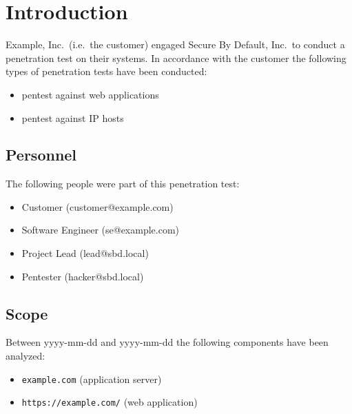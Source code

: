 \documentclass[a4paper]{article}
\newcommand{\passthrough}[1]{\colorbox{code}{\lstset{mathescape=false}#1}}
\begin{document}
\clearpage
\tableofcontents

\clearpage
\section{Introduction}

Example, Inc.\ (i.e.\ the customer) engaged Secure By Default, Inc.\ to conduct a penetration test on their systems.
In accordance with the customer the following types of penetration tests have been conducted:

\begin{itemize}
      \item pentest against web applications

      \item pentest against IP hosts

  \end{itemize}

\subsection{Personnel}

The following people were part of this penetration test:

\begin{itemize}
      \item Customer (customer@example.com)

      \item Software Engineer (se@example.com)

      \item Project Lead (lead@sbd.local)

      \item Pentester (hacker@sbd.local)

  \end{itemize}

\subsection{Scope}

Between yyyy-mm-dd and yyyy-mm-dd the following components have been analyzed:

\begin{itemize}
      \item \passthrough{\lstinline!example.com!} (application server)

      \item \passthrough{\lstinline!https://example.com/!} (web application)

  \end{itemize}
\end{document}
